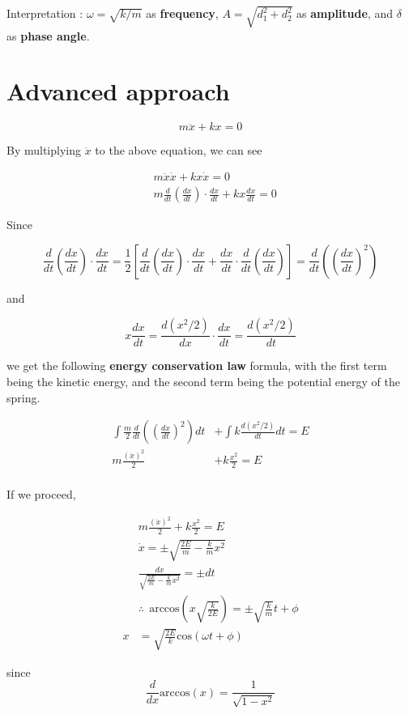 \documentclass[12pt]{article}
\begin{document}
\bigskip
\bigskip

Interpretation : $\omega = \sqrt{k/m}$ as \textbf{frequency}, $A = \sqrt{d_1^2 + d_2^2} $ as \textbf{amplitude}, and $\delta$ as \textbf{phase angle}.  



\pagebreak

\section*{Advanced approach}

$$
m \ddot{x} + k x = 0
$$

By multiplying $\dot{x}$ to the above equation, we can see

$$
\begin{aligned}
&m \ddot{x} \dot{x} + k x \dot{x} = 0 \\[10pt]
&m \frac{d}{dt} \left( \frac{dx}{dt} \right) \cdot \frac{dx}{dt} + k x \frac{dx}{dt} = 0
\end{aligned}
$$

Since 

$$\frac{d}{dt} \left( \frac{dx}{dt} \right) \cdot \frac{dx}{dt} = \frac{1}{2} \left[ \frac{d}{dt} \left( \frac{dx}{dt} \right) \cdot \frac{dx}{dt} + \frac{dx}{dt} \cdot  \frac{d}{dt} \left( \frac{dx}{dt} \right) \right] = \frac{d}{dt} \left( \left( \frac{dx}{dt} \right)^2 \right) $$

and 

$$x \frac{dx}{dt} = \frac{d (x^2/2) }{dx} \cdot \frac{dx}{dt} = \frac{d (x^2/2)}{dt}$$

\bigskip

we get the following \textbf{energy conservation law} formula, with the first term being the kinetic energy, and the second term being the potential energy of the spring.

$$
\begin{aligned}
\int \frac{m}{2} \frac{d}{dt} \left( \left( \frac{dx}{dt} \right)^2 \right) dt &+ \int k \frac{d (x^2/2)}{dt} dt = E\\[10pt]
m \frac{(\dot{x})^2}{2} &+ k\frac{x^2}{2} = E \\[12pt]
\end{aligned}
$$

\pagebreak
If we proceed, 

$$
\begin{aligned}
&m \frac{(\dot{x})^2}{2} + k\frac{x^2}{2} = E \\[12pt]
&\dot{x} = \pm \sqrt{\frac{2E}{m} - \frac{k}{m} x^2 } \\[10pt]
&\frac{dx}{\sqrt{\frac{2E}{m} - \frac{k}{m} x^2 }} = \pm dt \\[10pt]
&\therefore \ \ \mathrm{arccos} \left(x \sqrt{\frac{k}{2E}} \right) =  \pm \sqrt{\frac{k}{m}}t + \phi \\[10pt]
x &= \sqrt{\frac{2E}{k}} \mathrm{cos}(\omega t + \phi)
\end{aligned}
$$

\bigskip
\bigskip

since $$\frac{d}{dx} \mathrm{arccos} (x) = \frac{1}{\sqrt{1-x^2}}$$
\end{document}
